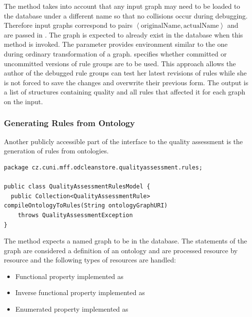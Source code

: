 The method  takes into account that any input graph may need to be loaded to the database under a different name so that no collisions occur during debugging. Therefore input graphs correspond to pairs $ \left< \text{originalName}, \text{actualName} \right> $ and are passed in . The graph is expected to already exist in the database when this method is invoked. The  parameter provides environment similar to the one during ordinary transformation of a graph.  specifies whether committed or uncommitted versions of rule groups are to be used. This approach allows the author of the debugged rule groups can test her latest revisions of rules while she is not forced to save the changes and overwrite their previous form. The output is a list of structures containing quality and all rules that affected it for each graph on the input.

\subsubsection*{Generating Rules from Ontology}

Another publicly accessible part of the interface to the quality assessment is the generation of rules from ontologies.

\begin{lstlisting}[caption=Quality Assessment Rule Generation,label=lst:qualityAssessmentRulesModel]
package cz.cuni.mff.odcleanstore.qualityassessment.rules;

public class QualityAssessmentRulesModel {
  public Collection<QualityAssessmentRule> compileOntologyToRules(String ontologyGraphURI)
    throws QualityAssessmentException
}
\end{lstlisting}

The method  expects a named graph  to be in the database. The statements of the graph are considered a definition of an ontology and are processed resource by resource and the following types of resources are handled:

\begin{itemize}
	\item Functional property implemented as 
	\item Inverse functional property implemented as 
	\item Enumerated property implemented as 
\end{itemize}

